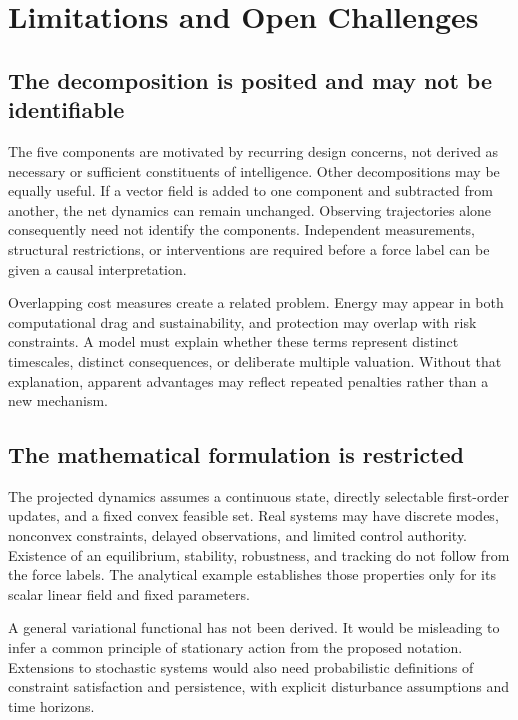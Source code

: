 \section{Limitations and Open Challenges}
\label{sec:limitations}

\subsection{The decomposition is posited and may not be identifiable}
The five components are motivated by recurring design concerns, not derived as necessary or sufficient constituents of intelligence. Other decompositions may be equally useful. If a vector field is added to one component and subtracted from another, the net dynamics can remain unchanged. Observing trajectories alone consequently need not identify the components. Independent measurements, structural restrictions, or interventions are required before a force label can be given a causal interpretation.

Overlapping cost measures create a related problem. Energy may appear in both computational drag and sustainability, and protection may overlap with risk constraints. A model must explain whether these terms represent distinct timescales, distinct consequences, or deliberate multiple valuation. Without that explanation, apparent advantages may reflect repeated penalties rather than a new mechanism.

\subsection{The mathematical formulation is restricted}
The projected dynamics assumes a continuous state, directly selectable first-order updates, and a fixed convex feasible set. Real systems may have discrete modes, nonconvex constraints, delayed observations, and limited control authority. Existence of an equilibrium, stability, robustness, and tracking do not follow from the force labels. The analytical example establishes those properties only for its scalar linear field and fixed parameters.

A general variational functional has not been derived. It would be misleading to infer a common principle of stationary action from the proposed notation. Extensions to stochastic systems would also need probabilistic definitions of constraint satisfaction and persistence, with explicit disturbance assumptions and time horizons.

